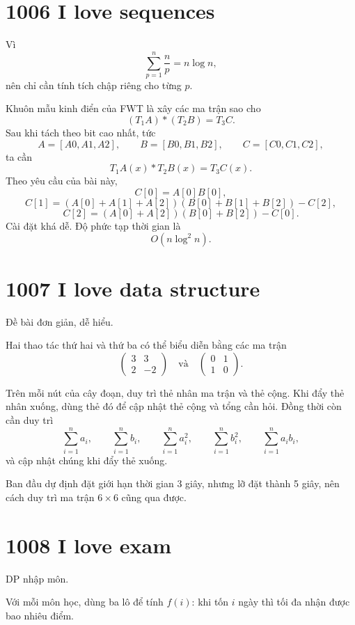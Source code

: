 \documentclass[11pt]{article}
\begin{document}
\section{1006 I love sequences}

Vì
\[
  \sum_{p=1}^{n}\frac{n}{p}=n\log n,
\]
nên chỉ cần tính tích chập riêng cho từng $p$.

Khuôn mẫu kinh điển của FWT là xây các ma trận sao cho
\[
  (T_1A) * (T_2B) = T_3C.
\]
Sau khi tách theo bit cao nhất, tức
\[
  A=[A0,A1,A2],\qquad B=[B0,B1,B2],\qquad C=[C0,C1,C2],
\]
ta cần
\[
  T_1A(x) * T_2B(x) = T_3C(x).
\]
Theo yêu cầu của bài này,
\[
  C[0]=A[0]B[0],
\]
\[
  C[1]=(A[0]+A[1]+A[2])(B[0]+B[1]+B[2])-C[2],
\]
\[
  C[2]=(A[0]+A[2])(B[0]+B[2])-C[0].
\]
Cài đặt khá dễ. Độ phức tạp thời gian là
\[
  O(n\log^2 n).
\]

\section{1007 I love data structure}

Đề bài đơn giản, dễ hiểu.

Hai thao tác thứ hai và thứ ba có thể biểu diễn bằng các ma trận
\[
  \begin{pmatrix}
    3 & 3\\
    2 & -2
  \end{pmatrix}
  \quad\text{và}\quad
  \begin{pmatrix}
    0 & 1\\
    1 & 0
  \end{pmatrix}.
\]

Trên mỗi nút của cây đoạn, duy trì thẻ nhân ma trận và thẻ cộng. Khi đẩy thẻ
nhân xuống, dùng thẻ đó để cập nhật thẻ cộng và tổng cần hỏi. Đồng thời còn
cần duy trì
\[
  \sum_{i=1}^{n} a_i,\qquad
  \sum_{i=1}^{n} b_i,\qquad
  \sum_{i=1}^{n} a_i^2,\qquad
  \sum_{i=1}^{n} b_i^2,\qquad
  \sum_{i=1}^{n} a_i b_i,
\]
và cập nhật chúng khi đẩy thẻ xuống.

Ban đầu dự định đặt giới hạn thời gian 3 giây, nhưng lỡ đặt thành 5 giây, nên
cách duy trì ma trận $6\times 6$ cũng qua được.

\section{1008 I love exam}

DP nhập môn.

Với mỗi môn học, dùng ba lô để tính $f(i)$: khi tốn $i$ ngày thì tối đa nhận
được bao nhiêu điểm.
\end{document}
